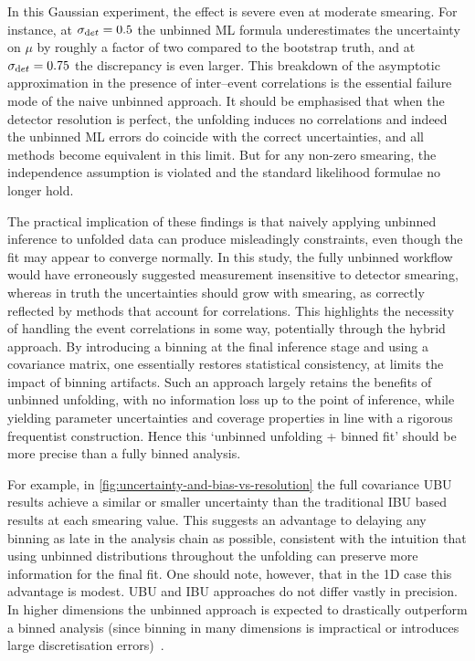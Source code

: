             In this Gaussian experiment, the effect is severe even at moderate smearing.
            For instance, at $\sigma_{\text det}=0.5$ the unbinned ML formula underestimates the uncertainty on $\mu$ by roughly a factor of two compared to the bootstrap truth, and at $\sigma_{\text det}=0.75$ the discrepancy is even larger.
            This breakdown of the asymptotic approximation in the presence of inter--event correlations is the essential failure mode of the naive unbinned approach.
            It should be emphasised that when the detector resolution is perfect, the unfolding induces no correlations and indeed the unbinned ML errors do coincide with the correct uncertainties, and all methods become equivalent in this limit.
            But for any non-zero smearing, the independence assumption is violated and the standard likelihood formulae no longer hold.
    
        The practical implication of these findings is that naively applying unbinned inference to unfolded data can produce misleadingly constraints, even though the fit may appear to converge normally.
        In this study, the fully unbinned workflow would have erroneously suggested measurement insensitive to detector smearing, whereas in truth the uncertainties should grow with smearing, as correctly reflected by methods that account for correlations.
        This highlights the necessity of handling the event correlations in some way, potentially through the hybrid approach.
        By introducing a binning at the final inference stage and using a covariance matrix, one essentially restores statistical consistency, at limits the impact of binning artifacts.
        Such an approach largely retains the benefits of unbinned unfolding, with no information loss up to the point of inference, while yielding parameter uncertainties and coverage properties in line with a rigorous frequentist construction.
        Hence this `unbinned unfolding + binned fit' should be more precise than a fully binned analysis.
        
        For example, in \cref{fig:uncertainty-and-bias-vs-resolution} the full covariance UBU results achieve a similar or smaller uncertainty than the traditional IBU based results at each smearing value.
        This suggests an advantage to delaying any binning as late in the analysis chain as possible, consistent with the intuition that using unbinned distributions throughout the unfolding can preserve more information for the final fit.
        One should note, however, that in the 1D case this advantage is modest.
        UBU and IBU approaches do not differ vastly in precision.
        In higher dimensions the unbinned approach is expected to drastically outperform a binned analysis (since binning in many dimensions is impractical or introduces large discretisation errors)~\cite{Pan:2024rfh, Butter2023MachineGeneration, Plehn:2022ftl}.
    
